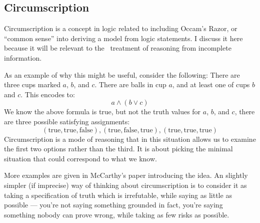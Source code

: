 \subsection{Circumscription}
\label{sec:circumscription}
Circumscription is a concept in logic related to including Occam's Razor, or ``common sense'' into deriving a model from logic statements.
I discuss it here because it will be relevant to the \sysname\ treatment of reasoning from incomplete information.

\newcommand{\true}{\textrm{true}}
\newcommand{\false}{\textrm{false}}
As an example of why this might be useful, consider the following:
There are three cups marked $a$, $b$, and $c$.
There are balls in cup $a$, and at least one of cups $b$ and $c$.
This encodes to:
\[a \wedge (b \vee c)\]
We know the above formula is true, but not the truth values for $a$, $b$, and $c$, there are three possible satisfying assignments:
\[
        (\true, \true, \false), (\true, \false, \true), (\true, \true, \true)
\]
Circumscription is a mode of reasoning that in this situation allows us to examine the first two options rather than the third.
It is about picking the minimal situation that could correspond to what we know.

More examples are given in McCarthy's paper introducing the idea\cite{circumscription}.
An slightly simpler (if imprecise) way of thinking about circumscription is to consider it as taking a specification of truth which is irrefutable, while saying as little as possible --- you're not saying something grounded in fact, you're saying something nobody can prove wrong, while taking as few risks as possible.
